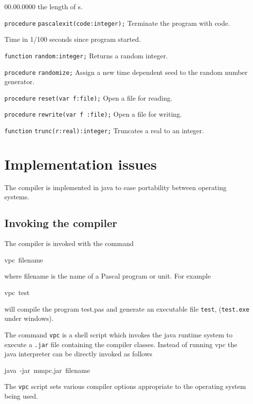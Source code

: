{\begin{lyxlist}{00.00.0000}
the length of s.
\item [\texttt{procedure}]\texttt{pascalexit(code:integer);} Terminate
the program with code.
\item [\texttt{\-}]Time in 1/100 seconds since program started.
\item [\texttt{function}]\texttt{random:integer;} Returns a random
integer.
\item [\texttt{procedure}]\texttt{randomize;} Assign a new time
dependent seed to the random number generator.
\item [\texttt{procedure}]\texttt{reset(var f:file);} Open a file for
reading.
\item [\texttt{procedure}]\texttt{rewrite(var f :file);} Open a file
for writing.
\item [\texttt{function}]\texttt{trunc(r:real):integer;} Truncates a real to an integer.
\end{lyxlist}

\chapter{Implementation issues}

The compiler is implemented in java to ease portability between operating systems.


\section{Invoking the compiler}

The compiler is invoked with the command \label{commandline}

\begin{lyxcode}
vpc~filename
\end{lyxcode}
where filename is the name of a Pascal program or unit. For example

\begin{lyxcode}
vpc~test
\end{lyxcode}
will compile the program test.pas and generate an executable file \texttt{test},
(\texttt{test.exe} under windows). 

The command \texttt{vpc} is a shell script which invokes the java runtime system
to execute a \texttt{.jar} file containing the compiler classes. Instead of
running vpc the java interpreter can be directly invoked as follows

\begin{lyxcode}
java~-jar~mmpc.jar~filename
\end{lyxcode}
The \texttt{vpc} script sets various compiler options appropriate to the operating
system being used.


}
